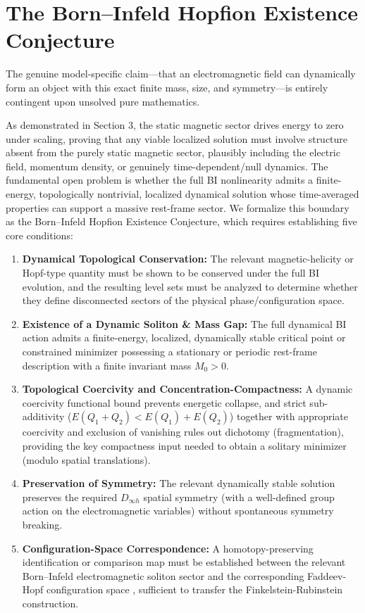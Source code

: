 \documentclass[11pt,a4paper]{article}
\begin{document}
\section{The Born--Infeld Hopfion Existence Conjecture}
The genuine model-specific claim---that an electromagnetic field can dynamically form an object with this exact finite mass, size, and symmetry---is entirely contingent upon unsolved pure mathematics.

As demonstrated in Section 3, the static magnetic sector drives energy to zero under scaling, proving that any viable localized solution must involve structure absent from the purely static magnetic sector, plausibly including the electric field, momentum density, or genuinely time-dependent/null dynamics. The fundamental open problem is whether the full BI nonlinearity admits a finite-energy, topologically nontrivial, localized dynamical solution whose time-averaged properties can support a massive rest-frame sector. We formalize this boundary as the Born--Infeld Hopfion Existence Conjecture, which requires establishing five core conditions:

\begin{enumerate}
    \item \textbf{Dynamical Topological Conservation:} The relevant magnetic-helicity or Hopf-type quantity must be shown to be conserved under the full BI evolution, and the resulting level sets must be analyzed to determine whether they define disconnected sectors of the physical phase/configuration space.
    \item \textbf{Existence of a Dynamic Soliton \& Mass Gap:} The full dynamical BI action admits a finite-energy, localized, dynamically stable critical point or constrained minimizer possessing a stationary or periodic rest-frame description with a finite invariant mass $M_0 > 0$.
    \item \textbf{Topological Coercivity and Concentration-Compactness:} A dynamic coercivity functional bound prevents energetic collapse, and strict sub-additivity ($E(Q_1 + Q_2) < E(Q_1) + E(Q_2)$) together with appropriate coercivity and exclusion of vanishing rules out dichotomy (fragmentation), providing the key compactness input needed to obtain a solitary minimizer (modulo spatial translations).
    \item \textbf{Preservation of Symmetry:} The relevant dynamically stable solution preserves the required $D_{\infty h}$ spatial symmetry (with a well-defined group action on the electromagnetic variables) without spontaneous symmetry breaking.
    \item \textbf{Configuration-Space Correspondence:} A homotopy-preserving identification or comparison map must be established between the relevant Born--Infeld electromagnetic soliton sector and the corresponding Faddeev-Hopf configuration space \cite{Faddeev1997, Ranada1989}, sufficient to transfer the Finkelstein-Rubinstein construction.
\end{enumerate}
\end{document}
